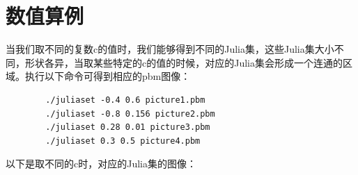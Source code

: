 \documentclass[UTF8,a4paper]{ctexart}
\begin{document}
	\section{数值算例}
	当我们取不同的复数c的值时，我们能够得到不同的Julia集，这些Julia集大小不同，形状各异，当取某些特定的c的值的时候，对应的Julia集会形成一个连通的区域。执行以下命令可得到相应的pbm图像：
	\begin{verbatim}
		./juliaset -0.4 0.6 picture1.pbm
		./juliaset -0.8 0.156 picture2.pbm
		./juliaset 0.28 0.01 picture3.pbm
		./juliaset 0.3 0.5 picture4.pbm
	\end{verbatim}
	以下是取不同的c时，对应的Julia集的图像：
	\begin{figure}[ht]
		\centering
	\end{figure}
\end{document}
